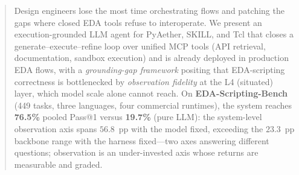 \begin{abstract}
    Design engineers lose the most time orchestrating flows and patching the gaps
    where closed EDA tools refuse to interoperate. We present an
    execution-grounded LLM agent for PyAether, SKILL, and Tcl that closes a
    generate--execute--refine loop over unified MCP tools (API retrieval,
    documentation, sandbox execution) and is already deployed in production EDA
    flows, with a \emph{grounding-gap framework} positing that EDA-scripting
    correctness is bottlenecked by \emph{observation fidelity} at the L4
    (situated) layer, which model scale alone cannot reach. On
    \textbf{EDA-Scripting-Bench} (449 tasks, three languages, four
    commercial runtimes), the system reaches \textbf{76.5\%} pooled Pass@1 versus
    \textbf{19.7\%} (pure LLM): the system-level observation axis spans
    $56.8$~pp with the model fixed, exceeding the $23.3$~pp backbone range with
    the harness fixed---two axes answering different questions; observation is an under-invested axis whose returns are measurable and graded.
\end{abstract}

